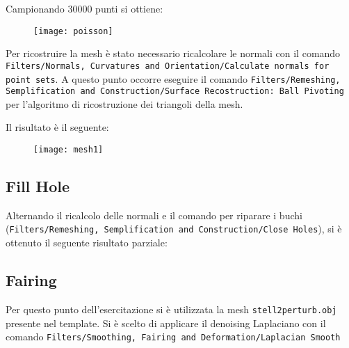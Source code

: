 Campionando 30000 punti si ottiene:
 \begin{figure}[htb]
    \centering
    \texttt{[image: poisson]}
    \caption{\label{fig:poisson}}
    \vspace{-0.3cm}
\end{figure}

Per ricostruire la mesh è stato necessario ricalcolare le normali con il comando \texttt{Filters/\-Normals, \-Curvatures and \-Orientation/\-Calculate normals \-for \-point \-sets}. A questo punto occorre eseguire il comando \texttt{Filters/\-Remeshing, \-Semplification and \-Construction/\-Surface\- Recostruction\-: Ball \-Pivoting} per l'algoritmo di ricostruzione dei triangoli della mesh.

Il risultato è il seguente:
 \begin{figure}[htb]
    \centering
    \texttt{[image: mesh1]}
    \caption{\label{fig:mesh}}
    \vspace{-0.3cm}
\end{figure}

\subsection{Fill Hole}
Alternando il ricalcolo delle normali e il comando per riparare i buchi (\texttt{Filters/\-Remeshing, \-Semplification\- and \-Construction/Close Holes}), si è ottenuto il seguente risultato parziale:
\begin{figure}[hbt]
    \centering
	\vspace{-0.2cm}
\end{figure}


\subsection{Fairing}
Per questo punto dell'esercitazione si è utilizzata la mesh \texttt{stell2perturb.obj} presente nel template.
Si è scelto di applicare il denoising Laplaciano con il comando \texttt{Filters/\-Smoothing, \-Fairing \-and \-Deformation/\-Laplacian \-Smooth}

\begin{figure}[hbt]
    \centering
	\vspace{-0.2cm}
\end{figure}

